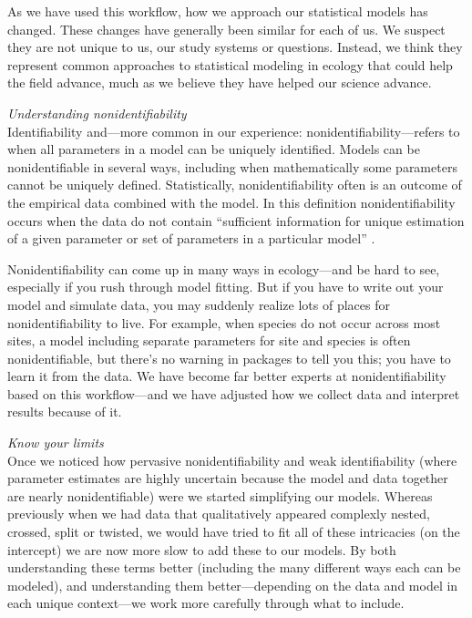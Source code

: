 \documentclass[11pt]{article}
\begin{document}
{As we have used this workflow, how we approach our statistical models has changed. These changes have generally been similar for each of us. We suspect they are not unique to us, our study systems or questions. Instead, we think they represent common approaches to statistical modeling in ecology that could help the field advance, much as we believe they have helped our science advance. 

 \emph{Understanding nonidentifiability} \\
Identifiability and---more common in our experience: nonidentifiability---refers to when all parameters in a model can be uniquely identified. Models can be nonidentifiable in several ways, including when mathematically some parameters cannot be uniquely defined. Statistically, nonidentifiability often is an outcome of the empirical data combined with the model. In this definition nonidentifiability occurs when the data do not contain ``sufficient information for unique estimation of a given parameter or set of parameters in a particular model'' \citep{gelmanhill}. 

Nonidentifiability can come up in many ways in ecology---and be hard to see, especially if you rush through model fitting. But if you have to write out your model and simulate data, you may suddenly realize lots of places for nonidentifiability to live. For example, when species do not occur across most sites, a model including separate parameters for site and species is often nonidentifiable, but there's no warning in packages to tell you this; you have to learn it from the data. We have become far better experts at nonidentifiability based on this workflow---and we have adjusted how we collect data and interpret results because of it. %

 \emph{Know your limits} \\ %
Once we noticed how pervasive nonidentifiability and weak identifiability (where parameter estimates are highly uncertain because the model and data together are nearly nonidentifiable) were we started simplifying our models. Whereas previously when we had data that qualitatively appeared complexly nested, crossed, split or twisted, we would have tried to fit all of these intricacies (on the intercept) we are now more slow to add these to our models. By both understanding these terms better (including the many different ways each can be modeled), and understanding them better---depending on the data and model in each unique context---we work more carefully through what to include. %

}
\end{document}
